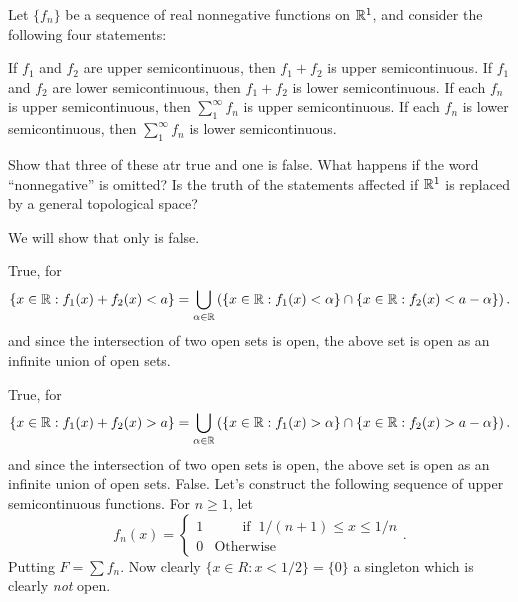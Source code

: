 \begin{enumerate}

\begin{excopy}
Let \(\{f_n\}\) be a sequence of real nonnegative functions on \(\mathbb{R}^1\),
and consider the following four statements:
\begin{itemize}
   If \(f_1\) and \(f_2\) are upper semicontinuous,
   then \(f_1 + f_2\) is upper semicontinuous.
   If \(f_1\) and \(f_2\) are lower semicontinuous,
   then \(f_1 + f_2\) is lower semicontinuous.
   If each \(f_n\) is upper semicontinuous, then \(\sum_1^\infty f_n\)
   is upper semicontinuous.
   If each \(f_n\) is lower semicontinuous, then \(\sum_1^\infty f_n\)
   is lower semicontinuous.
\end{itemize}
Show that three of these atr true and one is false.
What happens if the word ``nonnegative'' is omitted?
Is the truth of the statements affected if \(\mathbb{R}^1\) is replaced
by a general topological space?
\end{excopy}

We will show that only  is false.

\begin{itemize}
  True, for
  \begin{equation*}
  \{x\in\mathbb{R}: f_1(x)+f_2(x) < a\}
  = \bigcup_{\alpha\in\mathbb{R}} \left(\{x\in\mathbb{R}: f_1(x)< \alpha\} \cap
                             \{x\in\mathbb{R}: f_2(x) < a-\alpha\} \right).
  \end{equation*}
  and since the intersection of two open sets is open, the above
  set is open as an infinite union of open sets.

  True, for
  \begin{equation*}
  \{x\in\mathbb{R}: f_1(x)+f_2(x) > a\}
  = \bigcup_{\alpha\in\mathbb{R}} \left(\{x\in\mathbb{R}: f_1(x)> \alpha\} \cap
                             \{x\in\mathbb{R}: f_2(x) > a-\alpha\} \right).
  \end{equation*}
  and since the intersection of two open sets is open, the above
  set is open as an infinite union of open sets.
 False. Let's construct the following sequence of upper semicontinuous
 functions. For \(n\geq 1\), let
 \begin{equation*}
  f_n(x) = \left\{\begin{array}{lc}
        1 & \qquad\textrm{if }\  1/(n+1) \leq x \leq 1/n \\
        0 & \textrm{Otherwise}
                  \end{array}\right..
 \end{equation*}
 Putting \(F = \sum f_n\).
 Now clearly \(\{x\in R: x < 1/2\} = \{0\}\) a singleton which is clearly
 \emph{not} open.


\end{itemize}
\end{enumerate}
